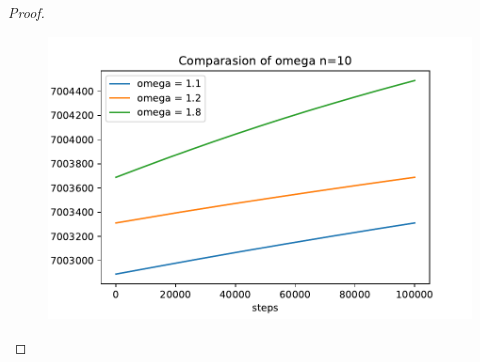 \documentclass[11pt,a4paper]{article}
\renewcommand{\(}{\left(}
\renewcommand{\)}{\right)}
\begin{document}
\begin{proof}
\begin{figure}
  		\includegraphics[]{omega-n10}
  	\end{figure}
  	
  \end{proof}  
\end{document}
